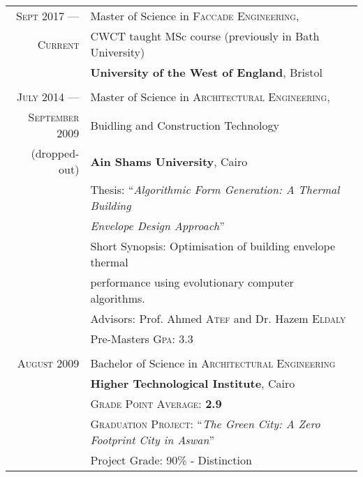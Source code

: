 \documentclass[a4paper,11pt]{article} %
\begin{document}
\begin{tabular}{r|l}	

\textsc{Sept} 2017 --- & Master of Science in \textsc{Fac{c}ade Engineering},\\ 
\textsc{Current} & CWCT taught MSc course (previously in Bath University)\\
&\textbf{University of the West of England}, Bristol\\
\multicolumn{2}{c}{} \\

	
\textsc{July} 2014 --- & Master of Science in \textsc{Architectural Engineering},\\ 
\textsc{September} 2009 & Buidling and Construction Technology\\
\small(dropped-out)& \textbf{Ain Shams University}, Cairo \\
& Thesis: ``\emph{Algorithmic Form Generation: A Thermal Building}\\
&\emph{Envelope Design Approach}'' \\
&\small Short Synopsis: Optimisation of building envelope thermal\\
&\small performance using evolutionary computer algorithms.\\
& \small Advisors: Prof. Ahmed \textsc{Atef} and Dr. Hazem \textsc{Eldaly}\\
&\normalsize Pre-Masters \textsc{Gpa}: 3.3\\
\multicolumn{2}{c}{} \\


\textsc{August} 2009& Bachelor of Science in \textsc{Architectural Engineering} \\
& \normalsize\textbf{Higher Technological Institute}, Cairo\\
&\small \textsc{Grade Point Average}: \textbf{2.9} \\
&\small \textsc{Graduation Project:} ``\emph{The Green City: A Zero Footprint City in Aswan}''\\
&\small Project Grade: 90\% - Distinction\\

\end{tabular}



\end{document}
